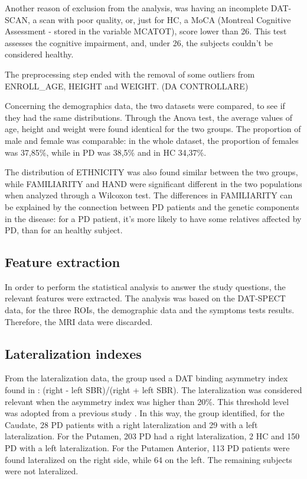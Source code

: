 \documentclass[]{article}
\begin{document}
\begin{multicols}{2}

Another reason of exclusion from the analysis, was having an incomplete DAT-SCAN, a scan with poor quality, or, just for HC, a MoCA (Montreal Cognitive Assessment - stored in the variable MCATOT), score lower than 26. This test assesses the cognitive impairment, and, under 26, the subjects couldn't be considered healthy. 

The preprocessing step ended with the removal of some outliers from ENROLL\_AGE, HEIGHT and WEIGHT. (DA CONTROLLARE)

Concerning the demographics data, the two datasets were compared, to see if they had the same distributions. Through the Anova test, the average values of age, height and weight were found identical for the two groups. The proportion of male and female was comparable: in the whole dataset, the proportion of females was 37,85\%, while in PD was 38,5\% and in HC 34,37\%. 

The distribution of ETHNICITY was also found similar between the two groups, while FAMILIARITY and HAND were significant different in the two populations when analyzed through a Wilcoxon test. The differences in FAMILIARITY can be explained by the connection between PD patients and the genetic components in the disease: for a PD patient, it's more likely to have some relatives affected by PD, than for an healthy subject. 


\subsection{Feature extraction}

In order to perform the statistical analysis to answer the study questions, the relevant features were extracted.
The analysis was based on the DAT-SPECT data, for the three ROIs, the demographic data and the symptoms tests results. Therefore, the MRI data were discarded.

\subsection{Lateralization indexes}

From the lateralization data, the group used a DAT binding asymmetry index found in \cite{kaasinen_ipsilateral_2016}: (right - left SBR)/(right + left SBR). The lateralization was considered relevant when the asymmetry index was higher than 20\%.
This threshold level was adopted from a previous study \cite{fiorenzato_asymmetric_2021}. In this way, the group identified, for the Caudate, 28 PD patients with a right lateralization and 29 with a left lateralization. For the Putamen, 203 PD had a right lateralization, 2 HC and 150 PD with a left lateralization. For the Putamen Anterior, 113 PD patients were found lateralized on the right side, while 64 on the left. The remaining subjects were not lateralized.


\end{multicols}
\end{document}
